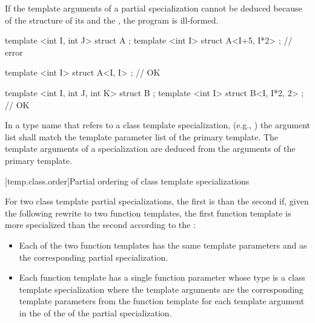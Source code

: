 \pnum
If the template arguments of a partial specialization cannot be deduced
because of the structure of its 
and the ,
the program is ill-formed.
\begin{example}
\begin{codeblock}
template <int I, int J> struct A {};
template <int I> struct A<I+5, I*2> {};     // error

template <int I> struct A<I, I> {};         // OK

template <int I, int J, int K> struct B {};
template <int I> struct B<I, I*2, 2> {};    // OK
\end{codeblock}
\end{example}

\pnum
In a type name that refers to a class template specialization, (e.g.,
)
the argument list shall match the template parameter list of the primary
template.
The template arguments of a specialization are deduced from the arguments
of the primary template.

[temp.class.order]{Partial ordering of class template specializations}

\pnum
For two class template partial specializations,
the first is  than the second if, given the following
rewrite to two function templates, the first function template is more
specialized than the second according to the :

\begin{itemize}
\item
Each of the two
function templates has the same template parameters
and 
as the corresponding partial specialization.
\item
Each function template
has a single function parameter
whose type is a class template specialization where the template arguments
are the corresponding template parameters from the function template
for each template argument
in the 
of the 
of the partial specialization.
\end{itemize}

